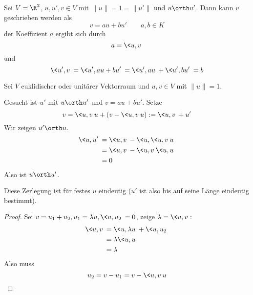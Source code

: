 \documentclass[a4paper, 10pt]{scrbook}
\begin{document}
\begin{ex}
	Sei $V=\R^2$, $u,u',v\in V$ mit $\|u\|=1=\|u'\|$ und $u\orth u'$.
	Dann kann $v$ geschrieben werden als
	\[
		v = au + bu' \qquad a,b\in K
	\]
	der Koeffizient $a$ ergibt sich durch
	\[
		a = \<u,v\>
	\]
	und
	\[
		\<u',v\> = \<u',au+bu'\> = \<u',au\> + \<u',bu'\> = b
	\]
\end{ex}

\begin{ex}
	Sei $V$ euklidischer oder unitärer Vektorraum und $u,v\in V$ mit $\|u\| = 1$.

	Gesucht ist $u'$ mit $u\orth u'$ und $v = au + bu'$.
	Setze
	\[
		v = \<u,v\>u + (v-\<u,v\> u) := \<u,v\> + u'
	\]
	Wir zeigen $u'\orth u$.
	\begin{align*}
		\<u, u'\> &= \<u,v\> - \<u,\<u,v\>u\>\\
				  &= \<u,v\> -\<u,v\>\<u,u\>\\
			&= 0
	\end{align*}
	Also ist $u\orth u'$.

	Diese Zerlegung ist für festes $u$ eindeutig ($u'$ ist also bis auf seine Länge eindeutig bestimmt).
	\begin{proof}
		Sei $v= u_1 + u_2, u_1 = \lambda u, \<u,u_2\> = 0$, zeige $\lambda = \<u,v\>$:
		\begin{align*}
			\<u,v\> &= \<u,\lambda u\> + \<u,u_2\>\\
					&= \lambda \<u,u\> \\
			  &= \lambda
		\end{align*}
		Also muss
		\[
			u_2 = v - u_1 = v - \<u,v\> u
		\]
	\end{proof}
\end{ex}
\end{document}
